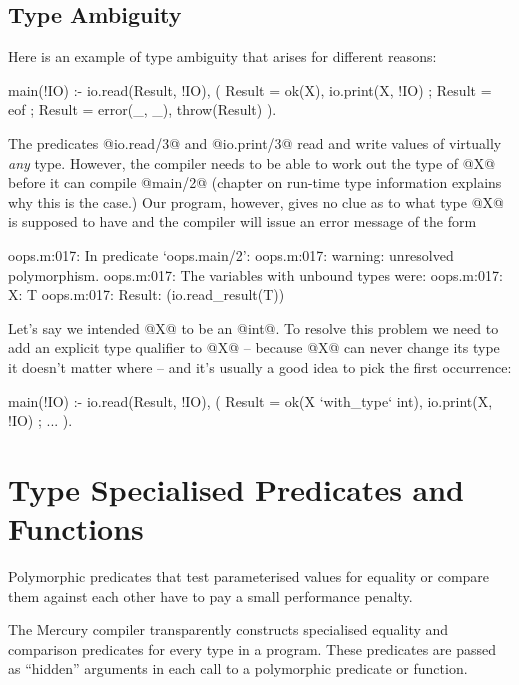 \subsection{Type Ambiguity}

Here is an example of type ambiguity that arises for different reasons:
\begin{myverbatim}
main(!IO) :-
    io.read(Result, !IO),
    (
        Result = ok(X),
        io.print(X, !IO)
    ;
        Result = eof
    ;
        Result = error(_, _),
        throw(Result)
    ).
\end{myverbatim}
The predicates @io.read/3@ and @io.print/3@ read and write values of
virtually \emph{any} type.  However, the compiler needs to be able to work
out the type of @X@ before it can compile @main/2@ (chapter \XXX{} on
run-time type information explains why this is the case.)  Our program,
however, gives no clue as to what type @X@ is supposed to have and the
compiler will issue an error message of the form
\begin{myverbatim}
oops.m:017: In predicate `oops.main/2':
oops.m:017:   warning: unresolved polymorphism.
oops.m:017:   The variables with unbound types were:
oops.m:017:       X: T
oops.m:017:       Result: (io.read_result(T))
\end{myverbatim}

Let's say we intended @X@ to be an @int@.
To resolve this problem we need to add an explicit type qualifier to @X@
-- because @X@ can never change its type it doesn't matter where --
and it's usually a good idea to pick the first occurrence:
\begin{myverbatim}
main(!IO) :-
    io.read(Result, !IO),
    (
        Result = ok(X `with_type` int),
        io.print(X, !IO)
    ;
        ...
    ).
\end{myverbatim}

\section{Type Specialised Predicates and Functions}


Polymorphic predicates that test parameterised values for equality or
compare them against each other have to pay a small performance penalty.

The Mercury compiler transparently constructs specialised equality and
comparison predicates for every type in a program.  These predicates are
passed as ``hidden'' arguments in each call to a polymorphic predicate or
function.

